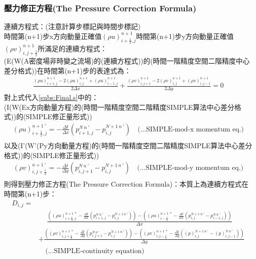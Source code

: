 \documentclass[12pt]{article}
\begin{document}
\subsubsection{壓力修正方程(The Pressure Correction Formula)}
\noindent 連續方程式：(注意計算步標記與時間步標記)\\[1.5ex]
\noindent 時間第(n+1)步x方向動量正確值$(\rho u)_{i+\frac{1}{2},j}^{n+1}$時間第(n+1)步y方向動量正確值$(\rho v)_{i,j+\frac{1}{2}}^{n+1}$所滿足的連續方程式：\\
\noindent (E(W(A密度場非時變之流場)的(連續方程式))的(時間一階精度空間二階精度中心差分格式))在時間第(n+1)步的表達式為：
\begin{equation}\begin{split}
    \frac{(\rho u)_{i+1,j}^{n+1} - 2(\rho u)_{i,j}^{n+1} + (\rho u)_{i-1,j}^{n+1}}{2\Delta x} + \frac{(\rho v)_{i,j+1}^{n+1} - 2(\rho v)_{i,j}^{n+1} + (\rho v)_{i,j-1}^{n+1}}{2\Delta y} = 0
\end{split}\end{equation}
\noindent 對上式代入\eqref{subs:Final.s}中的：\\
(I(W(Ex方向動量方程)的(時間一階精度空間二階精度SIMPLE算法中心差分格式))的(SIMPLE修正量形式))
\begin{equation}\begin{split}
    (\rho u)_{i+\frac{1}{2},j}^{n+1\ \prime} = - \frac{\Delta t}{\Delta x}(p_{i+1,j}^{N\ n\ \prime} - p_{i,j}^{N+1\ n\ \prime})  \quad \text{(...SIMPLE-mod-x momentum eq.)}\\[1.5ex]
\end{split}\end{equation}
\noindent 以及(I'(W'(Py方向動量方程)的(時間一階精度空間二階精度SIMPLE算法中心差分格式))的(SIMPLE修正量形式))
\begin{equation}\begin{split}
(\rho v)_{i,j+\frac{1}{2}}^{n+1\ \prime} =  - \frac{\Delta t}{\Delta y}(p_{i,j+1}^{N\ n\ \prime} - p_{i,j}^{N+1\ n\ \prime}) \quad \text{(...SIMPLE-mod-y momentum eq.)}\\[1.5ex]
\end{split}\end{equation}
則得到壓力修正方程(The Pressure Correction Formula)：本質上為連續方程式在時間第(n+1)步：
\begin{equation}\label{eq:n}\begin{split}
    D_{i,j} =\\[1.5ex]
        &\quad \ \frac{((\rho u)_{i+\frac{1}{2},j}^{n+1\ *} - \frac{\Delta t}{\Delta x}(p_{i+1,j}^{N\ n\ \prime} - p_{i,j}^{N+1\ n\ \prime})) - ((\rho u)_{i-\frac{1}{2}}^{n+1\ *} - \frac{\Delta t}{\Delta x}(p_{i,j}^{N+1\ n\ \prime} - p_{i-1,j}^{N\ n\ \prime})) }{\Delta x}\\[1.5ex]
        &+\frac{((\rho v)_{i,j+\frac{1}{2}}^{n+1\ *}- \frac{\Delta t}{\Delta y}(p_{i,j+1}^{N\ n\ \prime} - p_{i,j}^{N+1\ n\ \prime})) - ((\rho v)_{i,j-\frac{1}{2}}^{n+1\ *}-\frac{\Delta t}{\Delta y}((p)_{i,j}^{N+1\ n\ \prime} - (p)_{i,j-1}^{N\ n\ \prime}))}{\Delta y}\\[1.5ex]
        &\quad \text{(...SIMPLE-continuity equation)}\\[1.5ex]
\end{split}\end{equation}
\end{document}
